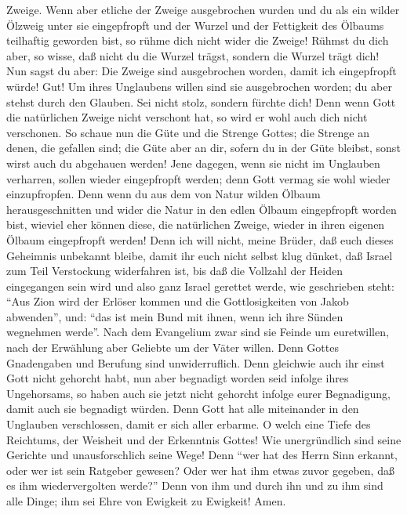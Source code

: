 Zweige.  Wenn aber etliche der Zweige ausgebrochen wurden
und du als ein wilder Ölzweig unter sie eingepfropft und der Wurzel und
der Fettigkeit des Ölbaums teilhaftig geworden bist,  so
rühme dich nicht wider die Zweige! Rühmst du dich aber, so wisse, daß
nicht du die Wurzel trägst, sondern die Wurzel trägt dich!
 Nun sagst du aber: Die Zweige sind ausgebrochen worden,
damit ich eingepfropft würde!  Gut! Um ihres Unglaubens
willen sind sie ausgebrochen worden; du aber stehst durch den Glauben.
Sei nicht stolz, sondern fürchte dich!  Denn wenn Gott
die natürlichen Zweige nicht verschont hat, so wird er wohl auch dich
nicht verschonen.  So schaue nun die Güte und die Strenge
Gottes; die Strenge an denen, die gefallen sind; die Güte aber an dir,
sofern du in der Güte bleibst, sonst wirst auch du abgehauen werden!
 Jene dagegen, wenn sie nicht im Unglauben verharren,
sollen wieder eingepfropft werden; denn Gott vermag sie wohl wieder
einzupfropfen.  Denn wenn du aus dem von Natur wilden
Ölbaum herausgeschnitten und wider die Natur in den edlen Ölbaum
eingepfropft worden bist, wieviel eher können diese, die natürlichen
Zweige, wieder in ihren eigenen Ölbaum eingepfropft werden!
 Denn ich will nicht, meine Brüder, daß euch dieses
Geheimnis unbekannt bleibe, damit ihr euch nicht selbst klug dünket, daß
Israel zum Teil Verstockung widerfahren ist, bis daß die Vollzahl der
Heiden eingegangen sein wird  und also ganz Israel
gerettet werde, wie geschrieben steht: ``Aus Zion wird der Erlöser
kommen und die Gottlosigkeiten von Jakob abwenden'', 
und: ``das ist mein Bund mit ihnen, wenn ich ihre Sünden wegnehmen
werde''.  Nach dem Evangelium zwar sind sie Feinde um
euretwillen, nach der Erwählung aber Geliebte um der Väter willen.
 Denn Gottes Gnadengaben und Berufung sind
unwiderruflich.  Denn gleichwie auch ihr einst Gott nicht
gehorcht habt, nun aber begnadigt worden seid infolge ihres Ungehorsams,
 so haben auch sie jetzt nicht gehorcht infolge eurer
Begnadigung, damit auch sie begnadigt würden.  Denn Gott
hat alle miteinander in den Unglauben verschlossen, damit er sich aller
erbarme.  O welch eine Tiefe des Reichtums, der Weisheit
und der Erkenntnis Gottes! Wie unergründlich sind seine Gerichte und
unausforschlich seine Wege!  Denn ``wer hat des Herrn
Sinn erkannt, oder wer ist sein Ratgeber gewesen?  Oder
wer hat ihm etwas zuvor gegeben, daß es ihm wiedervergolten werde?''
 Denn von ihm und durch ihn und zu ihm sind alle Dinge;
ihm sei Ehre von Ewigkeit zu Ewigkeit! Amen.

